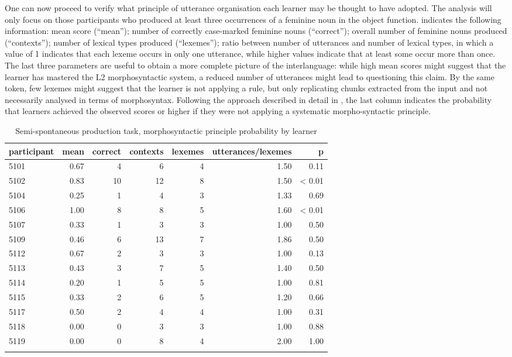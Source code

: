 One can now proceed to verify what principle of utterance organisation each learner may be thought to have adopted. The analysis will only focus on those participants who produced at least three occurrences of a feminine noun in the object function.  indicates the following information: mean score (“mean”); number of correctly case-marked feminine nouns (“correct”); overall number of feminine nouns produced (“contexts”); number of lexical types produced (“lexemes”); ratio between number of utterances and number of lexical types, in which a value of 1 indicates that each lexeme occurs in only one utterance, while higher values indicate that at least some occur more than once. The last three parameters are useful to obtain a more complete picture of the interlanguage: while high mean scores might suggest that the learner has mastered the L2 morphosyntactic system, a reduced number of utterances might lead to questioning this claim. By the same token, few lexemes might suggest that the learner is not applying a rule, but only replicating chunks extracted from the input and not necessarily analysed in terms of morphosyntax. Following the approach described in detail in , the last column indicates the probability that learners achieved the observed scores or higher if they were not applying a systematic morpho-syntactic principle.

\begin{table}
    \begin{tabularx}{\textwidth}{lrrrrrr}
        \lsptoprule
         participant & mean & correct & contexts & lexemes & utterances/lexemes & p\\
         \midrule
         5101 & 0.67 & 4 & 6 & 4 & 1.50 & 0.11\\
         5102 & 0.83 & 10 & 12 & 8 & 1.50 & < 0.01\\
         5104 & 0.25 & 1 & 4 & 3 & 1.33 & 0.69\\
         5106 & 1.00 & 8 & 8 & 5 & 1.60 & < 0.01\\
         5107 & 0.33 & 1 & 3 & 3 & 1.00 & 0.50\\
         5109 & 0.46 & 6 & 13 & 7 & 1.86 & 0.50\\
         5112 & 0.67 & 2 & 3 & 3 & 1.00 & 0.13\\
         5113 & 0.43 & 3 & 7 & 5 & 1.40 & 0.50\\
         5114 & 0.20 & 1 & 5 & 5 & 1.00 & 0.81\\
         5115 & 0.33 & 2 & 6 & 5 & 1.20 & 0.66\\
         5117 & 0.50 & 2 & 4 & 4 & 1.00 & 0.31\\
         5118 & 0.00 & 0 & 3 & 3 & 1.00 & 0.88\\
         5119 & 0.00 & 0 & 8 & 4 & 2.00 & 1.00\\
        \lspbottomrule
    \end{tabularx}
    \caption{Semi-spontaneous production task, morphosyntactic principle probability by learner}
    \label{tab:07:5}
\end{table}

